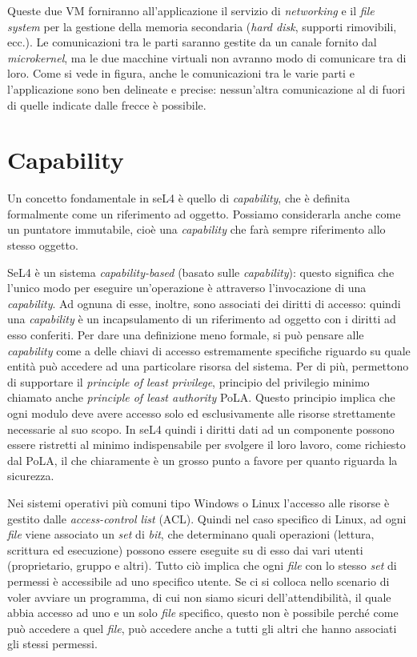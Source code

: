Queste due VM forniranno all'applicazione il servizio di \textit{networking} e il \textit{file system} per la gestione della memoria secondaria (\textit{hard disk}, supporti rimovibili, ecc.). Le comunicazioni tra le parti saranno gestite da un canale fornito dal \textit{microkernel}, ma le due macchine virtuali non avranno modo di comunicare tra di loro. Come si vede in figura, anche le comunicazioni tra le varie parti e l'applicazione sono ben delineate e precise: nessun'altra comunicazione al di fuori di quelle indicate dalle frecce è possibile.

\section{Capability}
Un concetto fondamentale in seL4 è quello di \textit{capability}, che è definita formalmente come un riferimento ad oggetto. Possiamo considerarla anche come un puntatore immutabile, cioè una \textit{capability} che farà sempre riferimento allo stesso oggetto.

SeL4 è un sistema \textit{capability-based} (basato sulle \textit{capability}): questo significa che l'unico modo per eseguire un'operazione è attraverso l'invocazione di una \textit{capability}. Ad ognuna di esse, inoltre, sono associati dei diritti di accesso: quindi una \textit{capability} è un incapsulamento di un riferimento ad oggetto con i diritti ad esso conferiti.
Per dare una definizione meno formale, si può pensare alle \textit{capability} come a delle chiavi di accesso estremamente specifiche riguardo su quale entità può accedere ad una particolare risorsa del sistema. Per di più, permettono di supportare il \textit{principle of least privilege}, principio del privilegio minimo chiamato anche \textit{principle of least authority} PoLA. Questo principio implica che ogni modulo deve avere accesso solo ed esclusivamente alle risorse strettamente necessarie al suo scopo.
In seL4 quindi i diritti dati ad un componente possono essere ristretti al minimo indispensabile per svolgere il loro lavoro, come richiesto dal PoLA, il che chiaramente è un grosso punto a favore per quanto riguarda la sicurezza.

Nei sistemi operativi più comuni tipo Windows o Linux l'accesso alle risorse è gestito dalle \textit{access-control list} (ACL). Quindi nel caso specifico di Linux, ad ogni \textit{file} viene associato un \textit{set} di \textit{bit}, che determinano quali operazioni (lettura, scrittura ed esecuzione) possono essere eseguite su di esso dai vari utenti (proprietario, gruppo e altri). Tutto ciò implica che ogni \textit{file} con lo stesso \textit{set} di permessi è accessibile ad uno specifico utente. Se ci si colloca nello scenario di voler avviare un programma, di cui non siamo sicuri dell'attendibilità, il quale abbia accesso ad uno e un solo \textit{file} specifico, questo non è possibile perché come può accedere a quel \textit{file}, può accedere anche a tutti gli altri che hanno associati gli stessi permessi.

